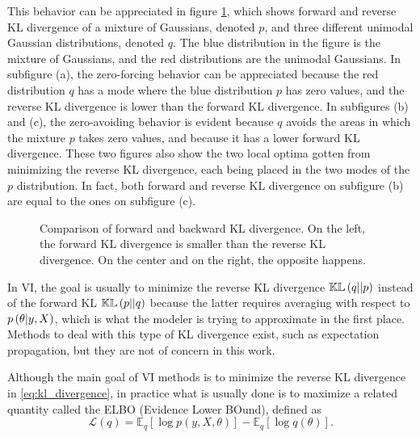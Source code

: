 This behavior can be appreciated in figure \ref{fig:KL_example}, which shows forward and reverse KL divergence of a mixture of Gaussians, denoted $p$, and three different unimodal Gaussian distributions, denoted $q$. The blue distribution in the figure is the mixture of Gaussians, and the red distributions are the unimodal Gaussians.
In subfigure (a), the zero-forcing behavior can be appreciated because the red distribution $q$ has a mode where the blue distribution $p$ has zero values, and the reverse KL divergence is lower than the forward KL divergence.
In subfigures (b) and (c), the zero-avoiding behavior is evident because $q$ avoids the areas in which the mixture $p$ takes zero values, and because it has a lower forward KL divergence. These two figures also show the two local optima gotten from minimizing the reverse KL divergence, each being placed in the two modes of the $p$ distribution. In fact, both forward and reverse KL divergence on subfigure (b) are equal to the ones on subfigure (c).

\begin{figure}[H]
  \centering
  \hfill
  \hfill
  \caption{Comparison of forward and backward KL divergence. On the left, the forward KL divergence is smaller than the reverse KL divergence. On the center and on the right, the opposite happens.}
  \label{fig:KL_example}
\end{figure}

In VI, the goal is usually to minimize the reverse KL divergence $\mathbb{KL}\left( q || p \right)$ instead of the forward KL $\mathbb{KL}\left( p || q \right)$ because the latter requires averaging with respect to $p\left( \theta | y, X \right)$, which is what the modeler is trying to approximate in the first place. Methods to deal with this type of KL divergence exist, such as expectation propagation, but they are not of concern in this work.

Although the main goal of VI methods is to minimize the reverse KL divergence in \ref{eq:kl_divergence}, in practice what is usually done is to maximize a related quantity called the ELBO (Evidence Lower BOund), defined as
\begin{equation}
  \label{eq:elbo_def}
  \mathcal{L}(q) = \mathbb{E}_q\left[ \log p(y, X, \theta) \right] - \mathbb{E}_q\left[ \log q(\theta) \right].
\end{equation}

